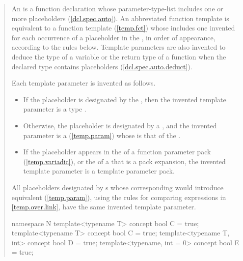 \begin{quote}
\begin{addedblock}
\pnum
An  is a function declaration whose
parameter-type-list includes one or more placeholders (\ref{dcl.spec.auto}).
% 
An abbreviated function template is equivalent to a function template
(\ref{temp.fct}) whose 
includes one invented  for each occurrence 
of a placeholder in the ,
in order of appearance, according to the rules below.
% 
\enternote
Template parameters are also invented to deduce the type of a variable
or the return type of a function when the declared type contains placeholders 
(\ref{dcl.spec.auto.deduct}).
\exitnote

\pnum
Each template parameter is invented as follows.
\begin{itemize}
\item If the placeholder is designated by the 
, then the invented template 
parameter is a type .

\item Otherwise, the placeholder is designated by a 
, and the invented 
parameter is a  (\ref{temp.param}) whose 
 is that of the 
.

\item If the placeholder appears in the  of a 
function parameter pack (\ref{temp.variadic}), or the 
 of a  that is a pack 
expansion, the invented template parameter is a 
template parameter pack.
\end{itemize}
% 
All placeholders designated by s 
whose corresponding  would introduce 
equivalent  (\ref{temp.param}), 
using the rules for comparing expressions in \ref{temp.over.link}, have 
the same invented template parameter.
% 
\enterexample
\begin{codeblock}
namespace N {
  template<typename T> concept bool C = true;
}
template<typename T> concept bool C = true;
template<typename T, int> concept bool D = true;
template<typename, int = 0> concept bool E = true;


\end{codeblock}
\end{addedblock}
\end{quote}
